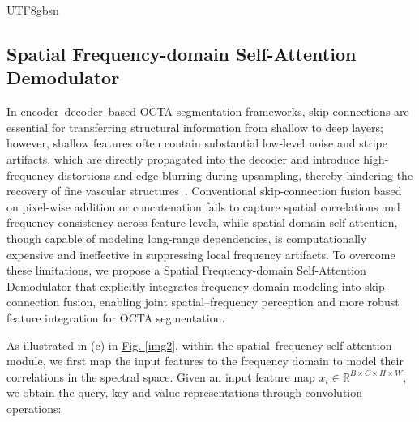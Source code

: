 \documentclass[times, review, 10pt]{elsarticle}
\begin{document}
\begin{CJK}{UTF8}{gbsn}
\subsection{Spatial Frequency-domain Self-Attention Demodulator}
In encoder–decoder–based OCTA segmentation frameworks, skip connections are essential for transferring structural information from shallow to deep layers; however, shallow features often contain substantial low-level noise and stripe artifacts, which are directly propagated into the decoder and introduce high-frequency distortions and edge blurring during upsampling, thereby hindering the recovery of fine vascular structures~\cite{ref50}. Conventional skip-connection fusion based on pixel-wise addition or concatenation fails to capture spatial correlations and frequency consistency across feature levels, while spatial-domain self-attention, though capable of modeling long-range dependencies, is computationally expensive and ineffective in suppressing local frequency artifacts. To overcome these limitations, we propose a Spatial Frequency-domain Self-Attention Demodulator that explicitly integrates frequency-domain modeling into skip-connection fusion, enabling joint spatial–frequency perception and more robust feature integration for OCTA segmentation.
\par
As illustrated in (c) in \hyperref[img2]{Fig. \ref*{img2}}, within the spatial–frequency self-attention module, we first map the input features to the frequency domain to model their correlations in the spectral space. Given an input feature map $x_i \in \mathbb{R}^{B \times C \times H \times W}$, we obtain the query, key and value representations through convolution operations:
\begin{equation}

\end{equation}
\end{CJK}
\end{document}
